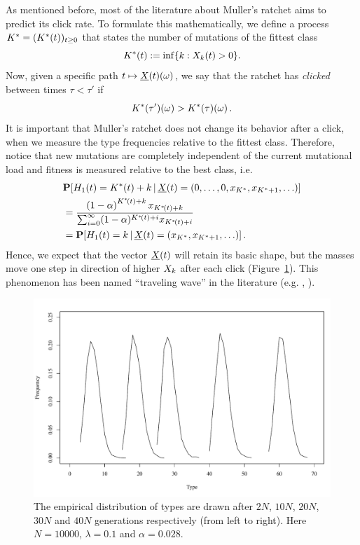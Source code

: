 \noindent
As mentioned before, most of the literature about Muller's ratchet aims to predict its click rate.
To formulate this mathematically, we define a process $K^* = (K^* \! \left( t \right))_{t \geq 0}$ that states the
number of mutations of the fittest class
\[ K^* \! \left( t \right) := \inf \{ k: X_{k} \! \left( t \right) > 0 \}. \]
Now, given a specific path $t \mapsto \underline{X}\!\left(t\right)\!\left(\omega\right)$, we say that the
ratchet has \emph{clicked} between times $\tau < \tau'$ if
\[ K^* \! \left(\tau'\right) \! \left(\omega\right) > K^* \! \left(\tau\right) \! \left(\omega\right). \] 
It is important that Muller's ratchet does not change its behavior after a click, when
we measure the type frequencies relative to the fittest class. Therefore, notice that new
mutations are completely independent of the current mutational load and fitness is measured relative
to the best class, i.e.
\begin{equation}
\begin{aligned} \label{mr:eq:recurrence}
 & \CPR{H_1(t) = \fC(t)+k}{\mrT{t} = (0,\ldots,0,x_{\fC},x_{\fC+1},\ldots)} \\
 & =  \frac{\left( 1-\alpha \right)^{\fCT{t}+k} x_{\fCT{t}+k} }
   				 { \sum_{i=0}^\infty (1-\alpha)^{\fCT{t}+i} x_{\fCT{t}+i} } \\
 & =  \CPR{H_1(t) = k}{\mrT{t} = (x_{\fC},x_{\fC+1},\ldots)}.
\end{aligned}
\end{equation}
Hence, we expect that the vector $\underline{X}\!\left(t\right)$ will retain its basic shape, but the masses move one
step in direction of higher $X_{k}$ after each click (Figure~\ref{mr:f:TravelingWave}). This
phenomenon has been named ``traveling wave'' in the literature (e.g.
\cite{higgs_accumulation_1995}, \cite{rouzine_solitary_2003}).

\begin{figure}[ht]
  \begin{center}
	\includegraphics[width=14cm]{img/TravelingWave.pdf}
   \end{center}
  \caption{\label{mr:f:TravelingWave} The empirical distribution of types are
  drawn after $2N$, $10N$, $20N$, $30N$ and $40N$ generations respectively (from left to right).
   Here $N=10000$, $\lambda = 0.1$ and $\alpha =
  0.028$.}
\end{figure}
 
